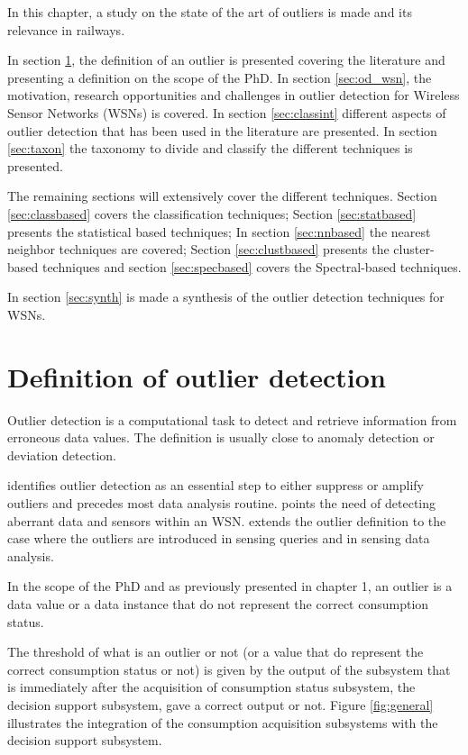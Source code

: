 In this chapter, a study on the state of  the art of outliers is made and its relevance in railways.

In section \ref{sec:def}, the definition of an outlier is presented covering the literature and presenting a definition on the scope of the PhD. 
In section \ref{sec:od_wsn}, the motivation, research opportunities and challenges in outlier detection for Wireless Sensor Networks (WSNs) is covered. 
In section \ref{sec:classint} different aspects of outlier detection that has been used in the literature are presented. 
In section \ref{sec:taxon} the taxonomy to divide and classify the different techniques is presented.

The remaining sections will extensively cover the different techniques. Section \ref{sec:classbased} covers the classification techniques; Section \ref{sec:statbased} presents the statistical based techniques; In section \ref{sec:nnbased} the nearest neighbor techniques are covered; Section \ref{sec:clustbased} presents the cluster-based techniques and section \ref{sec:specbased} covers the Spectral-based techniques.

In section \ref{sec:synth} is made a synthesis of the outlier detection techniques for WSNs.


\section{Definition of outlier detection}
\label{sec:def}
Outlier detection is a computational task to detect and retrieve information from erroneous data values. The definition is usually close to anomaly detection or deviation detection. 

\cite{class:branch:2006} identifies outlier detection as an essential step to either suppress or amplify outliers and precedes most data analysis routine. \cite{nn:abid:2016} points the need of detecting aberrant data and sensors within an WSN. \cite{nn:zhuang:2006} extends the outlier definition to the case where the outliers are introduced in sensing queries and in sensing data analysis.

\vspace{1em}

In the scope of the PhD and as previously presented in chapter 1, an outlier is a data value or a data instance that do not represent the correct consumption status.

The threshold of what is an outlier or not (or a value that do represent the correct consumption status or not) is given by the output of the subsystem that is immediately after the acquisition of consumption status subsystem, the decision support subsystem, gave a correct output or not. Figure \ref{fig:general} illustrates the integration of the consumption acquisition subsystems with the decision support subsystem.


